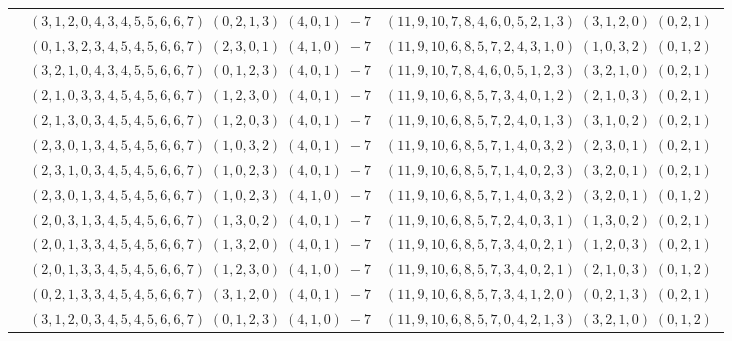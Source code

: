 \documentclass[11pt]{article}
\begin{document}
\begin{longtable}[l]{|c|c|c|}
 \cline{2-3} 
 & $(3 ,1 ,2 ,0 ,4 ,3 ,4 ,5 ,5 ,6 ,6 ,7) \;(0 ,2 ,1 ,3) \;(4 ,0 ,1) \;-7$ & $(11 ,9 ,10 ,7 ,8 ,4 ,6 ,0 ,5 ,2 ,1 ,3) \;(3 ,1 ,2 ,0) \;(0 ,2 ,1) \;$\\ 
 \cline{2-3} 
 & $(0 ,1 ,3 ,2 ,3 ,4 ,5 ,4 ,5 ,6 ,6 ,7) \;(2 ,3 ,0 ,1) \;(4 ,1 ,0) \;-7$ & $(11 ,9 ,10 ,6 ,8 ,5 ,7 ,2 ,4 ,3 ,1 ,0) \;(1 ,0 ,3 ,2) \;(0 ,1 ,2) \;$\\ 
 \cline{2-3} 
 & $(3 ,2 ,1 ,0 ,4 ,3 ,4 ,5 ,5 ,6 ,6 ,7) \;(0 ,1 ,2 ,3) \;(4 ,0 ,1) \;-7$ & $(11 ,9 ,10 ,7 ,8 ,4 ,6 ,0 ,5 ,1 ,2 ,3) \;(3 ,2 ,1 ,0) \;(0 ,2 ,1) \;$\\ 
 \cline{2-3} 
 & $(2 ,1 ,0 ,3 ,3 ,4 ,5 ,4 ,5 ,6 ,6 ,7) \;(1 ,2 ,3 ,0) \;(4 ,0 ,1) \;-7$ & $(11 ,9 ,10 ,6 ,8 ,5 ,7 ,3 ,4 ,0 ,1 ,2) \;(2 ,1 ,0 ,3) \;(0 ,2 ,1) \;$\\ 
 \cline{2-3} 
 & $(2 ,1 ,3 ,0 ,3 ,4 ,5 ,4 ,5 ,6 ,6 ,7) \;(1 ,2 ,0 ,3) \;(4 ,0 ,1) \;-7$ & $(11 ,9 ,10 ,6 ,8 ,5 ,7 ,2 ,4 ,0 ,1 ,3) \;(3 ,1 ,0 ,2) \;(0 ,2 ,1) \;$\\ 
 \cline{2-3} 
 & $(2 ,3 ,0 ,1 ,3 ,4 ,5 ,4 ,5 ,6 ,6 ,7) \;(1 ,0 ,3 ,2) \;(4 ,0 ,1) \;-7$ & $(11 ,9 ,10 ,6 ,8 ,5 ,7 ,1 ,4 ,0 ,3 ,2) \;(2 ,3 ,0 ,1) \;(0 ,2 ,1) \;$\\ 
 \cline{2-3} 
 & $(2 ,3 ,1 ,0 ,3 ,4 ,5 ,4 ,5 ,6 ,6 ,7) \;(1 ,0 ,2 ,3) \;(4 ,0 ,1) \;-7$ & $(11 ,9 ,10 ,6 ,8 ,5 ,7 ,1 ,4 ,0 ,2 ,3) \;(3 ,2 ,0 ,1) \;(0 ,2 ,1) \;$\\ 
 \cline{2-3} 
 & $(2 ,3 ,0 ,1 ,3 ,4 ,5 ,4 ,5 ,6 ,6 ,7) \;(1 ,0 ,2 ,3) \;(4 ,1 ,0) \;-7$ & $(11 ,9 ,10 ,6 ,8 ,5 ,7 ,1 ,4 ,0 ,3 ,2) \;(3 ,2 ,0 ,1) \;(0 ,1 ,2) \;$\\ 
 \cline{2-3} 
 & $(2 ,0 ,3 ,1 ,3 ,4 ,5 ,4 ,5 ,6 ,6 ,7) \;(1 ,3 ,0 ,2) \;(4 ,0 ,1) \;-7$ & $(11 ,9 ,10 ,6 ,8 ,5 ,7 ,2 ,4 ,0 ,3 ,1) \;(1 ,3 ,0 ,2) \;(0 ,2 ,1) \;$\\ 
 \cline{2-3} 
 & $(2 ,0 ,1 ,3 ,3 ,4 ,5 ,4 ,5 ,6 ,6 ,7) \;(1 ,3 ,2 ,0) \;(4 ,0 ,1) \;-7$ & $(11 ,9 ,10 ,6 ,8 ,5 ,7 ,3 ,4 ,0 ,2 ,1) \;(1 ,2 ,0 ,3) \;(0 ,2 ,1) \;$\\ 
 \cline{2-3} 
 & $(2 ,0 ,1 ,3 ,3 ,4 ,5 ,4 ,5 ,6 ,6 ,7) \;(1 ,2 ,3 ,0) \;(4 ,1 ,0) \;-7$ & $(11 ,9 ,10 ,6 ,8 ,5 ,7 ,3 ,4 ,0 ,2 ,1) \;(2 ,1 ,0 ,3) \;(0 ,1 ,2) \;$\\ 
 \cline{2-3} 
 & $(0 ,2 ,1 ,3 ,3 ,4 ,5 ,4 ,5 ,6 ,6 ,7) \;(3 ,1 ,2 ,0) \;(4 ,0 ,1) \;-7$ & $(11 ,9 ,10 ,6 ,8 ,5 ,7 ,3 ,4 ,1 ,2 ,0) \;(0 ,2 ,1 ,3) \;(0 ,2 ,1) \;$\\ 
 \cline{2-3} 
 & $(3 ,1 ,2 ,0 ,3 ,4 ,5 ,4 ,5 ,6 ,6 ,7) \;(0 ,1 ,2 ,3) \;(4 ,1 ,0) \;-7$ & $(11 ,9 ,10 ,6 ,8 ,5 ,7 ,0 ,4 ,2 ,1 ,3) \;(3 ,2 ,1 ,0) \;(0 ,1 ,2) \;$\\ 

\end{longtable}
\end{document}
